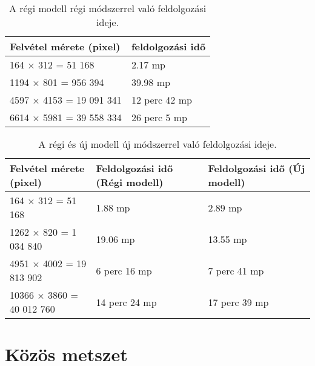 \begin{table}[H]
	\centering
	\begin{tabular}{ | p{} | p{} | }
		\hline
		\textbf{Felvétel mérete (pixel)} & \textbf{feldolgozási idő} \\
		\hline \hline
		164 × 312 = 51 168  & 2.17 mp  \\
		\hline
		1194 × 801 = 956 394 & 39.98 mp\\
		\hline
		4597 × 4153 = 19 091 341 & 12 perc 42 mp \\
		\hline
        6614 × 5981 = 39 558 334 & 26 perc 5 mp  \\
		\hline
	\end{tabular}
	\caption{A régi modell régi módszerrel való feldolgozási ideje.}
	\label{tab:old-speed}
\end{table}

\begin{table}[H]
	\centering
	\begin{tabular}{ | p{} | p{} | p{} | }
		\hline
		\textbf{Felvétel mérete (pixel)} & \textbf{Feldolgozási idő (Régi modell)} & \textbf{Feldolgozási idő (Új modell)} \\
		\hline \hline
		164 × 312 = 51 168  & 1.88 mp &  2.89 mp \\
		\hline
		1262 × 820 = 1 034 840 & 19.06 mp & 13.55 mp \\
		\hline
		4951 × 4002 = 19 813 902 & 6 perc 16 mp & 7 perc 41 mp \\
		\hline
        10366 × 3860 = 40 012 760 & 14 perc 24 mp & 17 perc 39 mp \\
		\hline
	\end{tabular}
	\caption{A régi és új modell új módszerrel való feldolgozási ideje.}
	\label{tab:new-speed}
\end{table}

\section{Közös metszet}
\label{ch:intersection}

